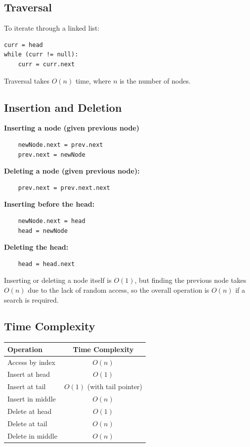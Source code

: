 \subsection{Traversal}
To iterate through a linked list:
\begin{verbatim}
curr = head
while (curr != null):
    curr = curr.next
\end{verbatim}
Traversal takes $O(n)$ time, where $n$ is the number of nodes.

\subsection{Insertion and Deletion}

\textbf{Inserting a node (given previous node)}
\begin{verbatim}
    newNode.next = prev.next
    prev.next = newNode
\end{verbatim}
\textbf{Deleting a node (given previous node):}
\begin{verbatim}
    prev.next = prev.next.next
\end{verbatim}
\textbf{Inserting before the head:}
\begin{verbatim}
    newNode.next = head
    head = newNode
\end{verbatim}
\textbf{Deleting the head:}
\begin{verbatim}
    head = head.next
\end{verbatim}

Inserting or deleting a node itself is $O(1)$, but finding the previous node takes $O(n)$ due to the lack of random access, so the overall operation is $O(n)$ if a search is required.

\subsection{Time Complexity}

\begin{center}
\begin{tabular}{l c}
\toprule
\textbf{Operation} & \textbf{Time Complexity} \\
\midrule
Access by index & $O(n)$ \\
Insert at head & $O(1)$ \\
Insert at tail & $O(1)$ (with tail pointer) \\
Insert in middle & $O(n)$ \\
Delete at head & $O(1)$ \\
Delete at tail & $O(n)$ \\
Delete in middle & $O(n)$ \\
\bottomrule
\end{tabular}
\end{center}

